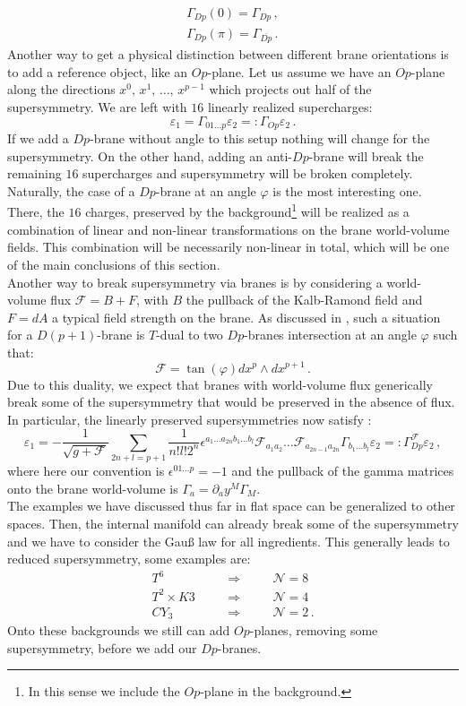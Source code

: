 \documentclass[a4paper,12pt,twoside,openright]{report}
\newcommand{\be}{\begin{equation}}
\newcommand{\ee}{\end{equation}}
\newcommand{\bea}{\begin{equation}\begin{aligned}}
\newcommand{\eea}{\end{aligned}\end{equation}}
\begin{document}
\bea
\Gamma_{Dp} (0) = \Gamma_{Dp}\,,\\
\Gamma_{Dp} (\pi) = \Gamma_{\overline{Dp}}\,.
\eea
Another way to get a physical distinction between different brane orientations is to add a reference object, like an $Op$-plane. Let us assume we have an $Op$-plane along the directions $x^0,\,x^1,\,\ldots ,\, x^{p-1}$ which projects out half of the supersymmetry. We are left with $16$ linearly realized supercharges:
\be 
\varepsilon_1 = \Gamma_{01\ldots p} \varepsilon_2 =: \Gamma_{Op}\varepsilon_2\,.
\ee
If we add a $Dp$-brane without angle to this setup nothing will change for the supersymmetry. On the other hand, adding an anti-$Dp$-brane will break the remaining $16$ supercharges and supersymmetry will be broken completely. Naturally, the case of a $Dp$-brane at an angle $\varphi$ is the most interesting one. There, the $16$ charges, preserved by the background\footnote{In this sense we include the $Op$-plane in the background.} will be realized as a combination of linear and non-linear transformations on the brane world-volume fields. This combination will be necessarily non-linear in total, which will be one of the main conclusions of this section.\\
Another way to break supersymmetry via branes is by considering a world-volume flux $\mathcal{F}=B+F$, with $B$ the pullback of the Kalb-Ramond field and $F=dA$ a typical field strength on the brane. As discussed in \cite{Johnson:2003glb}, such a situation for a $D(p+1)$-brane is $T$-dual to two $Dp$-branes intersection at an angle $\varphi$ such that:
\be 
\mathcal{F} = \tan (\varphi) dx^p \wedge dx^{p+1}\,.
\ee
Due to this duality, we expect that branes with world-volume flux generically break some of the supersymmetry that would be preserved in the absence of flux. In particular, the linearly preserved supersymmetries now satisfy \cite{Koerber:2010bx}:
\be 
\varepsilon_1 = - \frac{1}{\sqrt{g+\mathcal{F}}} \sum_{2n+l=p+1} \frac{1}{n!l!2^n} \epsilon^{a_1\dots a_{2n}b_1 \ldots b_l} \mathcal{F}_{a_1 a_2 } \ldots \mathcal{F}_{a_{2n-1}a_{2n}} \Gamma_{b_1 \ldots b_l} \varepsilon_2 =: \Gamma_{Dp}^{\mathcal{F}}\varepsilon_2\,,
\ee
where here our convention is $\epsilon^{01\dots p} = -1$ and the pullback of the gamma matrices onto the brane world-volume is $\Gamma_a = \partial_a y^M \Gamma_M$.\\
The examples we have discussed thus far in flat space can be generalized to other spaces. Then, the internal manifold can already break some of the supersymmetry and we have to consider the Gauß law for all ingredients. This generally leads to reduced supersymmetry, some examples are:
\be 
\begin{matrix}
     T^6 &\quad&\Rightarrow&\quad& \mathcal{N}=8\,\\
     T^2 \times K3 &\quad&\Rightarrow&\quad& \mathcal{N}=4\,\\
     CY_3 &\quad&\Rightarrow&\quad& \mathcal{N}=2\,.
\end{matrix}
\ee
Onto these backgrounds we still can add $Op$-planes, removing some supersymmetry, before we add our $Dp$-branes. 
\end{document}
